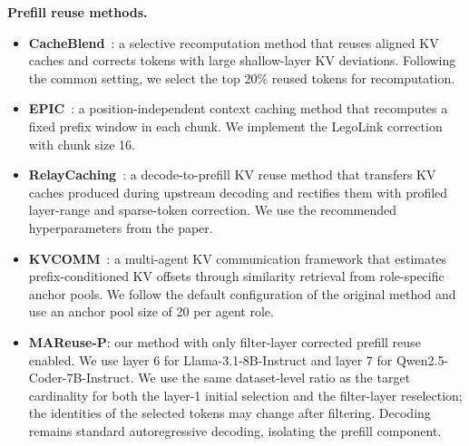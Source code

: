 \documentclass[letterpaper]{article} %
\begin{document}
\noindent\textbf{Prefill reuse methods.}
\begin{itemize}
    \item \textbf{CacheBlend}~\citep{DBLP:conf/eurosys/YaoLLRCZD0J25}: a selective recomputation method that reuses aligned KV caches and corrects tokens with large shallow-layer KV deviations. Following the common setting, we select the top 20\% reused tokens for recomputation.
    \item \textbf{EPIC}~\citep{DBLP:conf/icml/HuHWWHZFCS025}: a position-independent context caching method that recomputes a fixed prefix window in each chunk. We implement the LegoLink correction with chunk size 16.
    \item \textbf{RelayCaching}~\citep{DBLP:journals/corr/abs-2603-13289}: a decode-to-prefill KV reuse method that transfers KV caches produced during upstream decoding and rectifies them with profiled layer-range and sparse-token correction. We use the recommended hyperparameters from the paper.
    \item \textbf{KVCOMM}~\citep{DBLP:journals/corr/abs-2510-12872}: a multi-agent KV communication framework that estimates prefix-conditioned KV offsets through similarity retrieval from role-specific anchor pools. We follow the default configuration of the original method and use an anchor pool size of 20 per agent role.
    \item \textbf{MAReuse-P}: our method with only filter-layer corrected prefill reuse enabled. We use layer 6 for Llama-3.1-8B-Instruct and layer 7 for Qwen2.5-Coder-7B-Instruct. We use the same dataset-level ratio as the target cardinality for both the layer-1 initial selection and the filter-layer reselection; the identities of the selected tokens may change after filtering. Decoding remains standard autoregressive decoding, isolating the prefill component.
\end{itemize}
\end{document}
